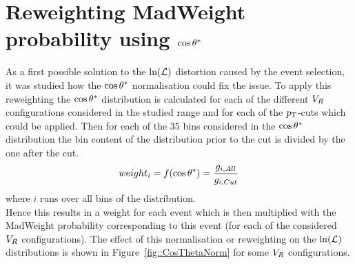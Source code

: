 \section{Reweighting MadWeight probability using $\cos \theta^{*}$}
As a first possible solution to the $\ln(\mathcal{L})$ distortion caused by the event selection, it was studied how the $\cos \theta^{*}$ normalisation could fix the issue. To apply this reweighting the $\cos \theta^{*}$ distribution is calculated for each of the different $V_{R}$ configurations considered in the studied range and for each of the $p_{\textrm T}$-cuts which could be applied. Then for each of the 35 bins considered in the $\cos \theta^{*}$ distribution the bin content of the distribution prior to the cut is divided by the one after the cut.
\begin{equation}
 weight_{i} = f(\cos \theta^{*}) = \frac{g_{i,All}}{g_{i,Cut}}
\end{equation}
where $i$ runs over all bins of the distribution.\\
Hence this results in a weight for each event which is then multiplied with the MadWeight probability corresponding to this event (for each of the considered $V_{R}$ configurations). The effect of this normalisation or reweighting on the $\ln(\mathcal{L})$ distributions is shown in Figure~\ref{fig::CosThetaNorm} for some $V_{R}$ configurations.
